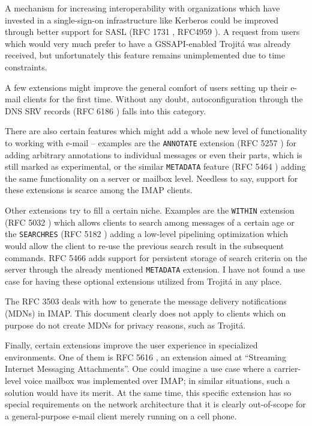 \documentclass[trojita]{subfiles}
\begin{document}
A mechanism for increasing interoperability with organizations which have invested in a single-sign-on infrastructure
like Kerberos could be improved through better support for SASL (RFC 1731 \cite{rfc1731}, RFC4959 \cite{rfc4959}).  A
request from users which would very much prefer to have a GSSAPI-enabled Trojitá was already received, but unfortunately
this feature remains unimplemented due to time constraints.

A few extensions might improve the general comfort of users setting up their e-mail clients for the first time.  Without
any doubt, autoconfiguration through the DNS SRV records (RFC 6186 \cite{rfc6186}) falls into this category.

There are also certain features which might add a whole new level of functionality to working with e-mail -- examples
are the {\tt ANNOTATE} extension (RFC 5257 \cite{rfc5257}) for adding arbitrary annotations to individual messages or
even their parts, which is still marked as experimental, or the similar {\tt METADATA} feature (RFC 5464 \cite{rfc5464})
adding the same functionality on a server or mailbox level.  Needless to say, support for these extensions is scarce
among the IMAP clients.

Other extensions try to fill a certain niche.  Examples are the {\tt WITHIN} extension (RFC 5032 \cite{rfc5032}) which
allows clients to search among messages of a certain age or the {\tt SEARCHRES} (RFC 5182 \cite{rfc5182}) adding a
low-level pipelining optimization which would allow the client to re-use the previous search result in the subsequent
commands.  RFC 5466 \cite{rfc5466} adds support for persistent storage of search criteria on the server through the
already mentioned {\tt METADATA} extension.  I have not found a use case for having these optional extensions utilized
from Trojitá in any place.

The RFC 3503 \cite{rfc3503} deals with how to generate the message delivery notifications (MDNs) in IMAP.  This document
clearly does not apply to clients which on purpose do not create MDNs for privacy reasons, such as Trojitá.

Finally, certain extensions improve the user experience in specialized environments.  One of them is RFC 5616
\cite{rfc5616}, an extension aimed at ``Streaming Internet Messaging Attachments''.  One could imagine a use case where
a carrier-level voice mailbox was implemented over IMAP; in similar situations, such a solution would have its merit.
At the same time, this specific extension has so special requirements on the network architecture that it is clearly
out-of-scope for a general-purpose e-mail client merely running on a cell phone.
\end{document}
